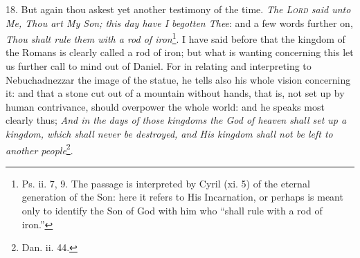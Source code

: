 18. But again thou askest yet another testimony of the time. \emph{The \textsc{Lord} said unto Me, Thou art My Son; this day have I begotten Thee}: and a few words further on, \emph{Thou shalt rule them with a rod of iron}\footnote{Ps. ii. 7, 9. The passage is interpreted by Cyril (xi. 5) of the eternal generation of the Son: here it refers to His Incarnation, or perhaps is meant only to identify the Son of God with him who “shall rule with a rod of iron.”}. I have said before that the kingdom of the Romans is clearly called a rod of iron; but what is wanting concerning this let us further call to mind out of Daniel. For in relating and interpreting to Nebuchadnezzar the image of the statue, he tells also his whole vision concerning it: and that a stone cut out of a mountain without hands, that is, not set up by human contrivance, should overpower the whole world: and he speaks most clearly thus; \emph{And in the days of} \emph{those kingdoms the God of heaven shall set up a kingdom, which shall never be destroyed, and His kingdom shall not be left to another people}\footnote{Dan. ii. 44.}.

